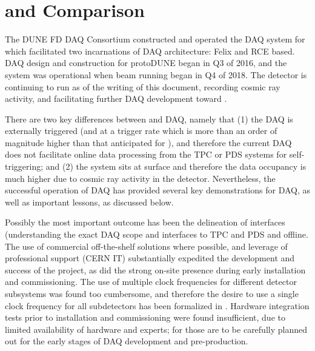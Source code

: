 \section{ and  Comparison}
\label{sec:fd-daq:protodune}

The DUNE FD DAQ Consortium constructed and operated the DAQ system for
 which facilitated two incarnations of DAQ
architecture: Felix and RCE based. DAQ design and construction for
protoDUNE began in Q3 of 2016, and the system was operational when
 beam running began in Q4 of 2018. The detector is
continuing to run as of the writing of this document, recording cosmic
ray activity, and facilitating further DAQ development toward
.

There are two key differences between  and
 DAQ, namely that (1) the  DAQ is externally
triggered (and at a trigger rate which is more than an order of
magnitude higher than that anticipated for ),
and therefore the current  DAQ does not facilitate online data
processing from the TPC or PDS systems for self-triggering; and (2) the
system sits at surface and therefore the data occupancy is much higher
due to cosmic ray activity in the detector. Nevertheless, the
successful operation of  DAQ has provided several key
demonstrations for  DAQ, as well as important lessons, as discussed below.

Possibly the most important outcome has been the delineation of
interfaces (understanding the exact DAQ scope and interfaces to TPC
and PDS and offline. The use of commercial off-the-shelf solutions
where possible, and leverage of professional support (CERN IT)
substantially expedited the development and success of the project, as
did the strong on-site presence during early installation and
commissioning. The use of multiple clock frequencies for different
detector subsystems was found too cumbersome, and therefore the desire
to use a single clock frequency for all  subdetectors has been
formalized in \citdocdb{}. Hardware integration tests prior to
installation and commissioning were found insufficient, due to limited
availability of hardware and experts; for  those are
to be carefully planned out for the early stages of DAQ development and
pre-production. 


